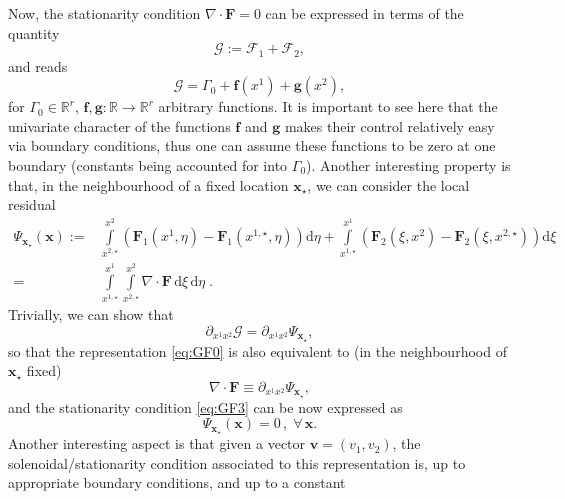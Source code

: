 \documentclass[a4paper,10pt]{article}
\begin{document}
Now, the stationarity condition $\nabla \cdot \mathbf{F} = 0$ can be expressed in terms of the quantity
\begin{equation}\label{eq:GF2}
 \mathcal{G} := \mathcal{F}_1 +\mathcal{F}_2,
 \end{equation}
 and reads
 \begin{equation}\label{eq:GF3}
 \mathcal{G} = \Gamma_0+ \mathbf{f}(x^1) + \mathbf{g}(x^2), 
\end{equation}
for $\Gamma_0\in \mathbb R^{r}$, $\mathbf{f}, \mathbf{g}:\mathbb R \to \mathbb R^{r}$ arbitrary functions.  
It is important to see here that the univariate character of the functions $ \mathbf{f}$ and $ \mathbf{g}$ makes their control relatively easy via boundary conditions,
thus one can assume these functions to be zero at one boundary (constants being accounted for into $\Gamma_0$). Another interesting property is that, in the neighbourhood of a fixed location $\mathbf{x}_\star$,
we can consider the local residual  
  \begin{equation}\label{eq:GF4}
  \begin{aligned}
      \Psi_{\mathbf{x}_\star}(\mathbf{x})  := &
  \int\limits_{x^{2,\star}}^{x^2} \left( \mathbf{F}_1(x^1,\eta) -\mathbf{F}_1(x^{1,\star},\eta) \right) \mathrm{d}\eta +
  \int\limits_{x^{1,\star}}^{x^1} \left( \mathbf{F}_2(\xi,x^2) -\mathbf{F}_2(\xi,x^{2,\star}) \right)   \mathrm{d}\xi\\
  = &  \int\limits_{x^{1,\star}}^{x^1}  \int\limits_{x^{2,\star}}^{x^2}\nabla\cdot  \mathbf{F} \, \mathrm{d} \xi\, \mathrm{d} \eta \;.
  \end{aligned}
  \end{equation}
  Trivially, we can show that 
  $$
  \partial_{x^1x^2} \mathcal{G}   =   \partial_{x^1x^2}  \Psi_{\mathbf{x}_\star},
  $$
  so  that the representation \eqref{eq:GF0} is also equivalent to (in the neighbourhood of   $\mathbf{x}_\star$ fixed)
    \begin{equation}\label{eq:GF5}
    \nabla\cdot  \mathbf{F} \equiv   \partial_{x^1x^2}  \Psi_{\mathbf{x}_\star},
  \end{equation}
  and the stationarity condition \eqref{eq:GF3}  can be now expressed as 
      \begin{equation}\label{eq:GF6}
      \Psi_{\mathbf{x}_\star}(\mathbf{x}) =0 \,,\;\forall \,\mathbf{x}.
        \end{equation}
 Another interesting aspect is that given a vector  $ \mathbf{v}=(v_1,v_2)$, the solenoidal/stationarity condition  associated to this representation  is, up to appropriate boundary conditions, and up to a constant 
\end{document}
